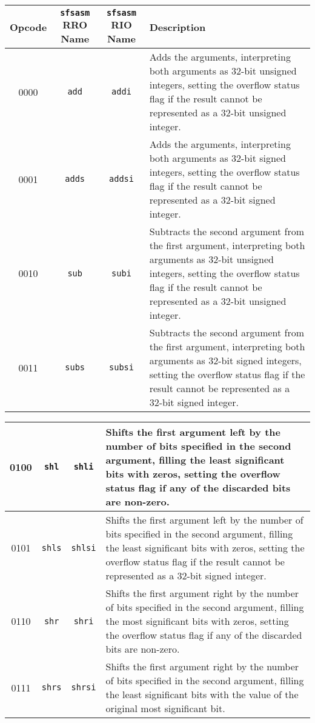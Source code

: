 \begin{tabularx}{\textwidth}{| c | c | c | X |} \hline
Opcode & {\tt sfsasm} RRO Name & {\tt sfsasm} RIO Name & Description \\ \hline
0000 & {\tt add} & {\tt addi} & Adds the arguments, interpreting both arguments as 32-bit unsigned integers, setting the overflow status flag if the result cannot be represented as a 32-bit unsigned integer. \\ \hline
0001 & {\tt adds} & {\tt addsi} & Adds the arguments, interpreting both arguments as 32-bit signed integers, setting the overflow status flag if the result cannot be represented as a 32-bit signed integer. \\ \hline
0010 & {\tt sub} & {\tt subi} & Subtracts the second argument from the first argument, interpreting both arguments as 32-bit unsigned integers, setting the overflow status flag if the result cannot be represented as a 32-bit unsigned integer. \\ \hline
0011 & {\tt subs} & {\tt subsi} & Subtracts the second argument from the first argument, interpreting both arguments as 32-bit signed integers, setting the overflow status flag if the result cannot be represented as a 32-bit signed integer. \\ \hline
\end{tabularx}

\begin{tabularx}{\textwidth}{| c | c | c | X |} \hline
0100 & {\tt shl} & {\tt shli} & Shifts the first argument left by the number of bits specified in the second argument, filling the least significant bits with zeros, setting the overflow status flag if any of the discarded bits are non-zero. \\ \hline
0101 & {\tt shls} & {\tt shlsi} & Shifts the first argument left by the number of bits specified in the second argument, filling the least significant bits with zeros, setting the overflow status flag if the result cannot be represented as a 32-bit signed integer. \\ \hline
0110 & {\tt shr} & {\tt shri} & Shifts the first argument right by the number of bits specified in the second argument, filling the most significant bits with zeros, setting the overflow status flag if any of the discarded bits are non-zero. \\ \hline
0111 & {\tt shrs} & {\tt shrsi} & Shifts the first argument right by the number of bits specified in the second argument, filling the least significant bits with the value of the original most significant bit. \\ \hline
\end{tabularx}

